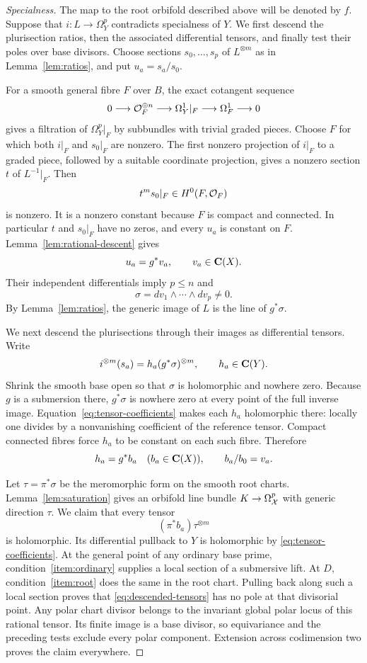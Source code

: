 \begin{proof}[Specialness]
The map to the root orbifold described above will be denoted by $f$. Suppose that $i:L\to\Omega_Y^p$ contradicts specialness of $Y$. We first descend the plurisection ratios, then the associated differential tensors, and finally test their poles over base divisors. Choose sections $s_0,\ldots,s_p$ of $L^{\otimes m}$ as in Lemma~\ref{lem:ratios}, and put $u_a=s_a/s_0$.

For a smooth general fibre $F$ over $B$, the exact cotangent sequence
\[
 0\longrightarrow\mathcal O_F^{\oplus n}
 \longrightarrow\Omega_Y^1|_F
 \longrightarrow\Omega_F^1\longrightarrow0
\]
gives a filtration of $\Omega_Y^p|_F$ by subbundles with trivial graded pieces. Choose $F$ for which both $i|_F$ and $s_0|_F$ are nonzero. The first nonzero projection of $i|_F$ to a graded piece, followed by a suitable coordinate projection, gives a nonzero section $t$ of $L^{-1}|_F$. Then
\[
 t^m s_0|_F\in H^0(F,\mathcal O_F)
\]
is nonzero. It is a nonzero constant because $F$ is compact and connected. In particular $t$ and $s_0|_F$ have no zeros, and every $u_a$ is constant on $F$. Lemma~\ref{lem:rational-descent} gives
\[
 u_a=g^*v_a,\qquad v_a\in\mathbf C(X).
\]
Their independent differentials imply $p\le n$ and
\[
 \sigma=dv_1\wedge\cdots\wedge dv_p\ne0.
\]
By Lemma~\ref{lem:ratios}, the generic image of $L$ is the line of $g^*\sigma$.

We next descend the plurisections through their images as differential tensors. Write
\begin{equation}\label{eq:tensor-coefficients}
 i^{\otimes m}(s_a)=h_a(g^*\sigma)^{\otimes m},
 \qquad h_a\in\mathbf C(Y).
\end{equation}
Shrink the smooth base open so that $\sigma$ is holomorphic and nowhere zero. Because $g$ is a submersion there, $g^*\sigma$ is nowhere zero at every point of the full inverse image. Equation~\eqref{eq:tensor-coefficients} makes each $h_a$ holomorphic there: locally one divides by a nonvanishing coefficient of the reference tensor. Compact connected fibres force $h_a$ to be constant on each such fibre. Therefore
\[
 h_a=g^*b_a\quad(b_a\in\mathbf C(X)),\qquad b_a/b_0=v_a.
\]

Let $\tau=\pi^*\sigma$ be the meromorphic form on the smooth root charts. Lemma~\ref{lem:saturation} gives an orbifold line bundle $K\to\Omega_{\mathcal X}^p$ with generic direction $\tau$. We claim that every tensor
\begin{equation}\label{eq:descended-tensors}
 (\pi^*b_a)\tau^{\otimes m}
\end{equation}
is holomorphic. Its differential pullback to $Y$ is holomorphic by \eqref{eq:tensor-coefficients}. At the general point of any ordinary base prime, condition~\ref{item:ordinary} supplies a local section of a submersive lift. At $D$, condition~\ref{item:root} does the same in the root chart. Pulling back along such a local section proves that \eqref{eq:descended-tensors} has no pole at that divisorial point. Any polar chart divisor belongs to the invariant global polar locus of this rational tensor. Its finite image is a base divisor, so equivariance and the preceding tests exclude every polar component. Extension across codimension two proves the claim everywhere.


\end{proof}
